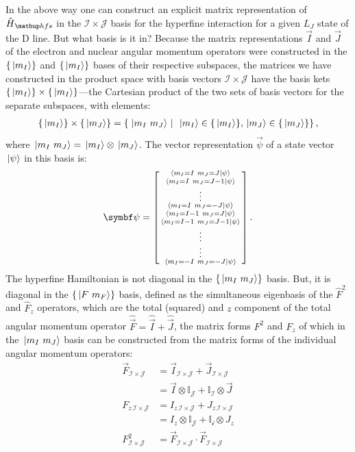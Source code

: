 In the above way one can construct an explicit matrix representation of $\hat H_\up{hfs}$ in the $\mathcal{I} \times \mathcal{J}$ basis for the hyperfine interaction for a given $L_J$ state of the D line. But what basis is it in? Because the matrix representations $\vec I$ and $\vec J$ of the electron and nuclear angular momentum operators were constructed in the $\{\ket{m_I}\}$ and $\{\ket{m_I}\}$ bases of their respective subspaces, the matrices we have constructed in the product space with basis vectors $\mathcal{I}\times\mathcal{J}$ have the basis kets $\{\ket{m_I}\} \times \{\ket{m_I}\}$---the Cartesian product of the two sets of basis vectors for the separate subspaces, with elements:
\begin{align}
\{\ket{m_I}\} \times \{\ket{m_J}\} = \left\{\left. \ket{m_I\ m_J} \ \right| \ \ket{m_I} \in \{\ket{m_I}\}, \ket{m_J} \in \{\ket{m_J}\}\right\},
\end{align}
where $\ket{m_I\ m_J} = \ket{m_I} \otimes \ket{m_J}$. The vector representation $\vec\psi$ of a state vector $\ket{\psi}$ in this basis is:
\begin{align}
\vec \psi = \left[\begin{smallmatrix}
\braket{m_I=I\ m_J=J}{\psi}\\
\braket{m_I=I\ m_J=J-1}{\psi}\\
\vdots\\
\braket{m_I=I\ m_J=-J}{\psi}\\
\braket{m_I=I-1\ m_J=J}{\psi}\\
\braket{m_I=I-1\ m_J=J-1}{\psi}\\
\vdots\\
\vdots\\
\braket{m_I=-I\ m_J=-J}{\psi}\\
\end{smallmatrix}\right].
\end{align}
The hyperfine Hamiltonian is not diagonal in the $\{\ket{m_I\ m_J}\}$ basis. But, it is diagonal in the $\{\ket{F\ m_F}\}$ basis, defined as the simultaneous eigenbasis of the $\hat F^2$ and $\hat F_z$ operators, which are the total (squared) and $z$ component of the total angular momentum operator $\hat{\vec{F}} = \hat{\vec{I}} + \hat{\vec{J}}$, the matrix forms $F^2$ and $F_z$ of which in the $\ket{m_I\ m_J}$ basis can be constructed from the matrix forms of the individual angular momentum operators:
\begin{align}
\vec F_{\mathcal{I}\times\mathcal{J}} &= \vec I_{\mathcal{I}\times\mathcal{J}} + \vec J_{\mathcal{I}\times\mathcal{J}}\nonumber\\
& = \vec I \otimes \mathbb{I}_{\mathcal{J}} + \mathbb{I}_{\mathcal{I}} \otimes \vec J\\
F_{z\,\mathcal{I}\times\mathcal{J}} &= I_{z\,\mathcal{I}\times\mathcal{J}} + J_{z\,\mathcal{I}\times\mathcal{J}}\nonumber\\
& = I_z \otimes \mathbb{I}_{\mathcal{J}} + \mathbb{I}_{\mathcal{i}} \otimes J_z\\
F^2_{\mathcal{I}\times\mathcal{J}} &= \vec F_{\mathcal{I}\times\mathcal{J}}\cdot\vec F_{\mathcal{I}\times\mathcal{J}}
\end{align}

